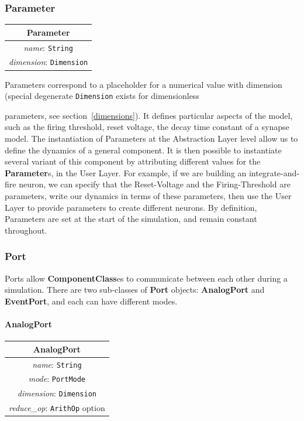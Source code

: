 \documentclass{article}
\newcommand{\nmlClass}[1]{{\bf #1}}
\newcommand{\ComponentClasses}{{\bf{ComponentClass}}es\xspace}
\newcommand{\Parameters}{{\bf{Parameter}}s\xspace}
\begin{document}
\subsubsection{Parameter}
\label{parameters}


\begin{table}[htb]
\center
\begin{tabular}{|c|}
\hline
\hline
Parameter \\
\hline
\hline
{\em name}: {\tt String} \\
\hline
{\em dimension}: {\tt Dimension} \\
\hline
\end{tabular}
\end{table}


Parameters correspond to a placeholder for a numerical value with
dimension (special degenerate {\tt Dimension} exists for dimensionless

parameters, see section~\ref{dimensions}). It defines particular
aspects of the model, such as the firing threshold, reset voltage, the
decay time constant of a synapse model.  The instantiation of
Parameters at the Abstraction Layer level allow us to define the
dynamics of a general component.  It is then possible to instantiate
several variant of this component by attributing different values for
the \Parameters, in the User Layer.  For example, if we are building
an integrate-and-fire neuron, we can specify that the Reset-Voltage
and the Firing-Threshold are parameters, write our dynamics in terms
of these parameters, then use the User Layer to provide parameters to
create different neurons. By definition, Parameters are set at the
start of the simulation, and remain constant throughout.


\subsubsection{Port}
\label{port}

Ports allow \ComponentClasses to communicate between each other during a simulation.
There are two sub-classes of \nmlClass{Port} objects: \nmlClass{AnalogPort}
and \nmlClass{EventPort}, and each can have different modes.

\paragraph{AnalogPort}


\begin{table}[htb]
\center
\begin{tabular}{|c|}
\hline
\hline
AnalogPort \\
\hline
\hline
{\em name}: {\tt String} \\
\hline
{\em mode}: {\tt PortMode} \\
\hline
{\em dimension}: {\tt Dimension} \\
\hline
{\em reduce\_op}: {\tt ArithOp} option \\
\hline
\end{tabular}
\end{table}
\end{document}
